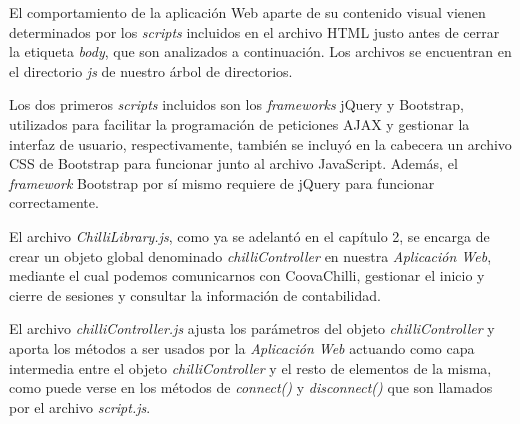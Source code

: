 El comportamiento de la aplicación Web aparte de su contenido visual vienen determinados por los \emph{scripts} incluidos en el archivo HTML justo antes de cerrar la etiqueta \emph{body}, que son analizados a continuación. Los archivos se encuentran en el directorio \emph{js} de nuestro árbol de directorios.


Los dos primeros \emph{scripts} incluidos son los \emph{frameworks} jQuery y Bootstrap, utilizados para facilitar la programación de peticiones AJAX y gestionar la interfaz de usuario, respectivamente, también se incluyó en la cabecera un archivo CSS de Bootstrap para funcionar junto al archivo JavaScript. Además, el \emph{framework} Bootstrap por sí mismo requiere de jQuery para funcionar correctamente.

El archivo \emph{ChilliLibrary.js}, como ya se adelantó en el capítulo 2, se encarga de crear un objeto global denominado \emph{chilliController} en nuestra \emph{Aplicación Web}, mediante el cual podemos comunicarnos con CoovaChilli, gestionar el inicio y cierre de sesiones y consultar la información de contabilidad.

El archivo \emph{chilliController.js} ajusta los parámetros del objeto \emph{chilliController} y aporta los métodos a ser usados por la \emph{Aplicación Web} actuando como capa intermedia entre el objeto \emph{chilliController} y el resto de elementos de la misma, como puede verse en los métodos de \emph{connect()} y \emph{disconnect()} que son llamados por el archivo \emph{script.js}.



